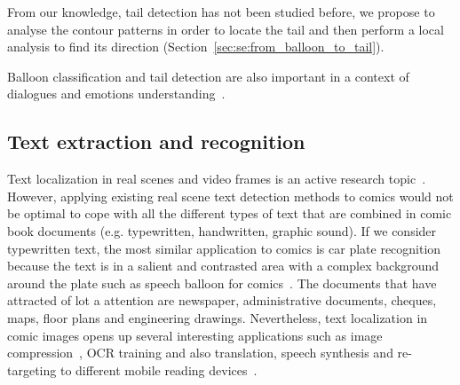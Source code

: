 From our knowledge, tail detection has not been studied before, we propose to analyse the contour patterns in order to locate the tail and then perform a local analysis to find its direction (Section~\ref{sec:se:from_balloon_to_tail}).

Balloon classification and tail detection are also important in a context of dialogues and emotions understanding~\cite{millidge2009comic}.









\subsection{Text extraction and recognition}
\label{sec:sota:text}


Text localization in real scenes and video frames is an active research topic~\cite{Jung04,ShahabICDAR2011Robust,KaratzasICDAR2013Robust}.
However, applying existing real scene text detection methods to comics would not be optimal to cope with all the different types of text that are combined in comic book documents (e.g. typewritten, handwritten, graphic sound).
If we consider typewritten text, the most similar application to comics is car plate recognition because the text is in a salient and contrasted area with a complex background around the plate such as speech balloon for comics~\cite{anagnostopoulos2008license}.
The documents that have attracted of lot a attention are newspaper, administrative documents, cheques, maps, floor plans and engineering drawings.
Nevertheless, text localization in comic images opens up several interesting applications such as image compression~\cite{Su11}, OCR training and also translation, speech synthesis and re-targeting to different mobile reading devices~\cite{Matsui2011}.

